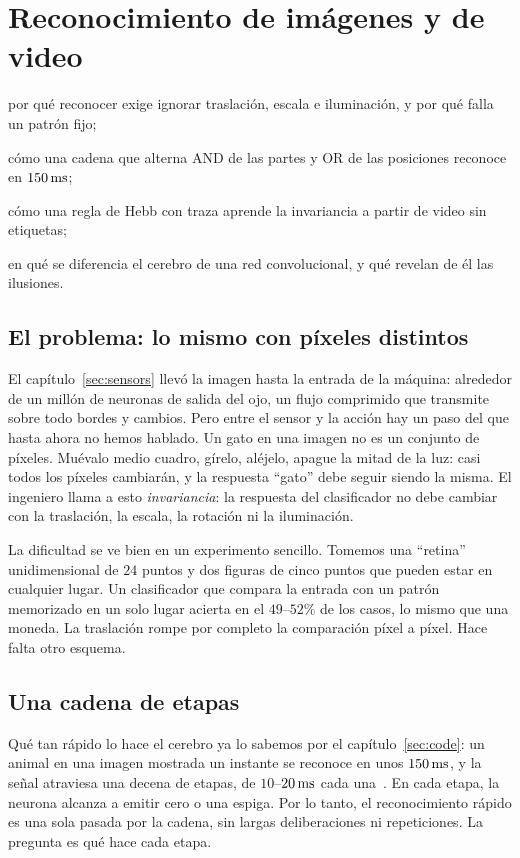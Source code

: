 \chapter{Reconocimiento de imágenes y de video}
\label{sec:recognition}
\begin{chaptergoals}
\item por qué reconocer exige ignorar traslación, escala e iluminación, y por qué falla un patrón fijo;
\item cómo una cadena que alterna AND de las partes y OR de las posiciones reconoce en $150\,\text{ms}$;
\item cómo una regla de Hebb con traza aprende la invariancia a partir de video sin etiquetas;
\item en qué se diferencia el cerebro de una red convolucional, y qué revelan de él las ilusiones.
\end{chaptergoals}

\section{El problema: lo mismo con píxeles distintos}

El capítulo~\ref{sec:sensors} llevó la imagen hasta la entrada de la máquina: alrededor de un millón de neuronas de salida del ojo, un flujo comprimido que transmite sobre todo bordes y cambios. Pero entre el sensor y la acción hay un paso del que hasta ahora no hemos hablado. Un gato en una imagen no es un conjunto de píxeles. Muévalo medio cuadro, gírelo, aléjelo, apague la mitad de la luz: casi todos los píxeles cambiarán, y la respuesta “gato” debe seguir siendo la misma. El ingeniero llama a esto \emph{invariancia}: la respuesta del clasificador no debe cambiar con la traslación, la escala, la rotación ni la iluminación.

La dificultad se ve bien en un experimento sencillo. Tomemos una “retina” unidimensional de $24$ puntos y dos figuras de cinco puntos que pueden estar en cualquier lugar. Un clasificador que compara la entrada con un patrón memorizado en un solo lugar acierta en el $49$--$52\%$ de los casos, lo mismo que una moneda. La traslación rompe por completo la comparación píxel a píxel. Hace falta otro esquema.

\section{Una cadena de etapas}

Qué tan rápido lo hace el cerebro ya lo sabemos por el capítulo~\ref{sec:code}: un animal en una imagen mostrada un instante se reconoce en unos $150\,\text{ms}$, y la señal atraviesa una decena de etapas, de $10$--$20\,\text{ms}$ cada una~\cite{Thorpe1996}. En cada etapa, la neurona alcanza a emitir cero o una espiga. Por lo tanto, el reconocimiento rápido es una sola pasada por la cadena, sin largas deliberaciones ni repeticiones. La pregunta es qué hace cada etapa.

